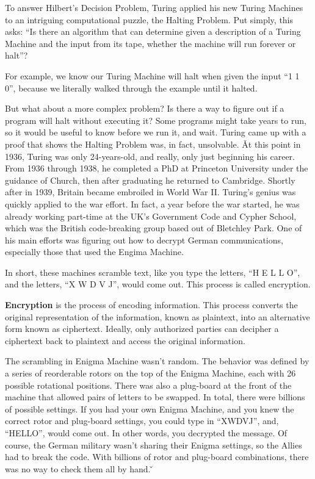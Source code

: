 To answer Hilbert's Decision Problem, Turing applied his new Turing Machines to an intriguing computational puzzle,
the Halting Problem. Put simply, this asks: ``Is there an algorithm that can determine given a description of a
Turing Machine and the input from its tape, whether the machine will run forever or halt''?

\be
For example, we know our Turing Machine will halt when given the input ``1 1 0'', because we literally walked through
the example until it halted.
\ee

But what about a more complex problem? Is there a way to figure out if a program will halt without executing it? Some
programs might take years to run, so it would be useful to know before we run it, and wait. Turing came up with a
proof that shows the Halting Problem was, in fact, unsolvable. \v

At this point in 1936, Turing was only 24-years-old, and really, only just beginning his career. From 1936 through
1938, he completed a PhD at Princeton University under the guidance of Church, then after graduating he returned to
Cambridge. Shortly after in 1939, Britain became embroiled in World War II. Turing's genius was quickly applied to
the war effort. In fact, a year before the war started, he was already working part-time at the UK's Government Code
and Cypher School, which was the British code-breaking group based out of Bletchley Park. One of his main efforts was
figuring out how to decrypt German communications, especially those that used the Engima Machine.


In short, these machines scramble text, like you type the letters, ``H E L L O'', and the letters, ``X W D V J'', would
come out. This process is called encryption.

\bd[Encryption]
\textbf{Encryption} is the process of encoding information. This process converts the original representation of the
information, known as plaintext, into an alternative form known as ciphertext. Ideally, only authorized parties can
decipher a ciphertext back to plaintext and access the original information.
\ed

The scrambling in Enigma Machine wasn't random. The behavior was defined by a series of reorderable rotors on the top
of the Enigma Machine, each with 26 possible rotational positions. There was also a plug-board at the front of the
machine that allowed pairs of letters to be swapped. In total, there were billions of possible settings. If you had
your own Enigma Machine, and you knew the correct rotor and plug-board settings, you could type in ``XWDVJ'', and,
``HELLO'', would come out. In other words, you decrypted the message. Of course, the German military wasn't sharing
their Enigma settings, so the Allies had to break the code. With billions of rotor and plug-board combinations, there
was no way to check them all by hand. \v

